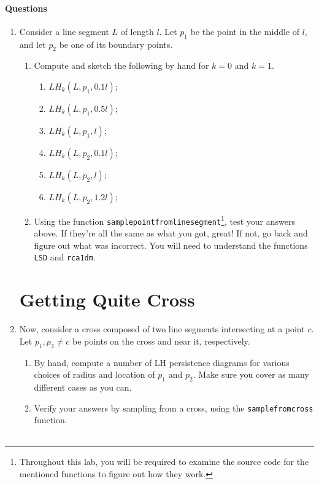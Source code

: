 \documentclass[12pt,twoside]{article}
\newcommand{\qns}{\paragraph*{Questions}}
\begin{document}
\qns\begin{enumerate}
       \item Consider a line segment $L$ of length $l$.  Let $p_1$ be the point in the middle of $l$, and let $p_2$ be one of its boundary points. \begin{enumerate}
          \item   Compute and sketch the following by hand for $k=0$ and $k=1$.
       
      \begin{enumerate}
         \item $LH_k(L, p_1, 0.1l)$;\vfill
         \item $LH_k(L, p_1, 0.5l)$;\vfill
         \item $LH_k(L, p_1, l)$;\vfill
         \item $LH_k(L, p_2, 0.1l)$;\vfill
         \item $LH_k(L, p_2, l)$;\vfill
         \item $LH_k(L, p_2, 1.2l)$;\vfill
      \end{enumerate}
      \item Using the function \verb|samplepointfromlinesegment|\footnote{Throughout this lab, you will be required to examine the source code for the mentioned functions to figure out how they work.}, test your answers above.  If they're all the same as what you got, great!  If not, go back and figure out what was incorrect.  You will need to understand the functions \verb|LSD| and \verb|rca1dm|.\\
       \end{enumerate}
       
\pagebreak

\section{Getting Quite Cross}
      \item Now, consider a cross composed of two line segments intersecting at a point $c$.  Let $p_1,p_2\neq c$ be points on the cross and near it, respectively.
      \begin{enumerate}
         \item By hand, compute a number of LH persistence diagrams for various choices of radius and location of $p_1$ and $p_2$.  Make sure you cover as many different cases as you can.\vfill
         \item Verify your answers by sampling from a cross, using the \verb|samplefromcross| function.\\ \\
      \end{enumerate}


\end{enumerate}
\end{document}
